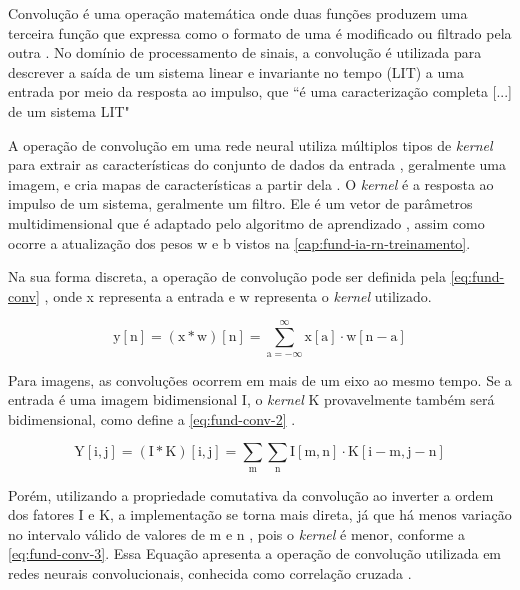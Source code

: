 Convolução é uma operação matemática onde duas funções produzem uma terceira função que expressa como o formato de uma é modificado ou filtrado pela outra \cite{ref:Yan}. No domínio de processamento de sinais, a convolução é utilizada para descrever a saída de um sistema linear e invariante no tempo (LIT) a uma entrada por meio da resposta ao impulso, que ``é uma caracterização completa [...] de um sistema LIT" \cite{ref:Oppenheim-Schafer}


A operação de convolução em uma rede neural utiliza múltiplos tipos de \textit{kernel} para extrair as características do conjunto de dados da entrada \cite{ref:Eden-Ierapetritou-Towler}, geralmente uma imagem, e cria mapas de características a partir dela \cite{ref:Gholamalinezhad-Khosravi}. O \textit{kernel} é a resposta ao impulso de um sistema, geralmente um filtro. Ele é um vetor de parâmetros multidimensional que é adaptado pelo algoritmo de aprendizado \cite{ref:Goodfellow-Bengio-Courville}, assim como ocorre a atualização dos pesos w e b vistos na \autoref{cap:fund-ia-rn-treinamento}.

Na sua forma discreta, a operação de convolução pode ser definida pela \autoref{eq:fund-conv} \cite{ref:Goodfellow-Bengio-Courville}, onde x representa a entrada e w representa o \textit{kernel} utilizado.

\begin{equation} \label{eq:fund-conv}
\mathrm{
  y[n] = (x \ast w)[n] = \sum_{a = -\infty}^{\infty} x[a] \cdot w [n - a]
}
\end{equation}

Para imagens, as convoluções ocorrem em mais de um eixo ao mesmo tempo. Se a entrada é uma imagem bidimensional I, o \textit{kernel} K provavelmente também será bidimensional, como define a \autoref{eq:fund-conv-2} \cite{ref:Goodfellow-Bengio-Courville}.

\begin{equation} \label{eq:fund-conv-2}
\mathrm{
  Y[i, j] = (I \ast K)[i, j] = \sum_{m} \sum_{n} I[m,n] \cdot K [i-m, j-n]
}
\end{equation}

Porém, utilizando a propriedade comutativa da convolução ao inverter a ordem dos fatores I e K, a implementação se torna mais direta, já que há menos variação no intervalo válido de valores de m e n \cite{ref:Goodfellow-Bengio-Courville}, pois o \textit{kernel} é menor, conforme a \autoref{eq:fund-conv-3}. Essa Equação apresenta a operação de convolução utilizada em redes neurais convolucionais, conhecida como correlação cruzada \cite{ref:Goodfellow-Bengio-Courville}.

